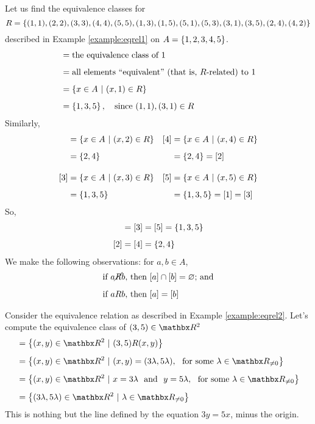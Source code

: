 \vspace*{1em}

\begin{example}
Let us find the equivalence classes for \[R = \set{(1,1),(2,2),(3,3),(4,4),(5,5),(1,3),(1,5),(5,1),(5,3),(3,1),(3,5),(2,4),(4,2)}\] described in Example \ref{example:eqrel1} on $A = \set{1,2,3,4,5}$.
\begin{align*}
[1] &= \text{the equivalence class of $1$}\\[0.5em]
 &= \text{all elements ``equivalent'' (that is, $R$-related) to $1$}\\[0.5em]
 &= \setp{x \in A}{(x,1) \in R}\\[0.5em]
 &= \set{1,3,5},\quad \text{since $(1,1),(3,1) \in R$}
\end{align*}
Similarly, 
\begin{align*}
[2] &= \setp{x \in A}{(x,2) \in R} & [4] &= \setp{x \in A}{(x,4) \in R}\\[0.5em]
 &= \set{2,4} & &= \set{2,4} = [2]\\[1em]
%
[3] &= \setp{x \in A}{(x,3) \in R} & [5] &= \setp{x \in A}{(x,5) \in R}\\[0.5em]
 &= \set{1,3,5} & &= \set{1,3,5} = [1] = [3]
\end{align*}
So, 
\begin{align*}
[1] &= [3] = [5] = \set{1,3,5}\\[0.5em]
[2] &= [4] = \set{2,4}\\
\end{align*}
We make the following observations: for $a,b \in A$,
\begin{align*}
\text{if $a\cancel{R}b$},& \text{ then $[a] \cap [b] = \emptyset$; and}\\[0.5em]
\text{if $aRb$},& \text{ then $[a] = [b]$}
\end{align*}
\end{example}

\vspace*{1em}

\begin{example}
Consider the equivalence relation as described in Example \ref{example:eqrel2}. Let's compute the equivalence class of $(3,5) \in \rr^2$
\begin{align*}
[(3,5)] &= \setp{(x,y) \in \rr^2}{(3,5) R (x,y)}\\[0.5em]
 &= \setp{(x,y) \in \rr^2}{(x,y) = (3\lambda,5\lambda),\ \text{ for some $\lambda \in \rr_{\neq 0}$}}\\[0.5em]
 &= \setp{(x,y) \in \rr^2}{x = 3\lambda\ \text{ and }\ y = 5\lambda,\ \text{ for some $\lambda \in \rr_{\neq 0}$}}\\[0.5em]
 &= \setp{(3\lambda,5\lambda) \in \rr^2}{\lambda \in \rr_{\neq 0}}
\end{align*}
This is nothing but the line defined by the equation $3y = 5x$, minus the origin.
\end{example}

